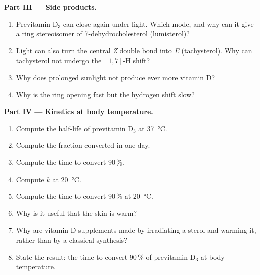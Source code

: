 \begin{problem}
\medskip\noindent\textbf{Part III --- Side products.}
\begin{enumerate}[resume]
  \item Previtamin D$_3$ can close again under light. Which mode, and why can it give a
        ring stereoisomer of 7-dehydrocholesterol (lumisterol)?
  \item Light can also turn the central \textit{Z} double bond into \textit{E} (tachysterol). Why
        can tachysterol not undergo the $[1,7]$-H shift?
  \item Why does prolonged sunlight not produce ever more vitamin D?
  \item Why is the ring opening fast but the hydrogen shift slow?
\end{enumerate}

\medskip\noindent\textbf{Part IV --- Kinetics at body temperature.}
\begin{enumerate}[resume]
  \item Compute the half-life of previtamin D$_3$ at \qty{37}{\celsius}.
  \item Compute the fraction converted in one day.
  \item Compute the time to convert 90\,\%.
  \item Compute $k$ at \qty{20}{\celsius}.
  \item Compute the time to convert 90\,\% at \qty{20}{\celsius}.
  \item Why is it useful that the skin is warm?
  \item Why are vitamin D supplements made by irradiating a sterol and warming it,
        rather than by a classical synthesis?
  \item State the result: the time to convert 90\,\% of previtamin D$_3$ at body temperature.
\end{enumerate}
\end{problem}
